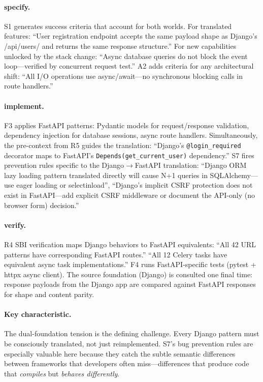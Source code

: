 \documentclass[11pt,a4paper,openright,twoside]{report}
\begin{document}
\paragraph{specify.}
S1 generates success criteria that account for both worlds. For translated features: ``User registration endpoint accepts the same payload shape as Django's /api/users/ and returns the same response structure.'' For new capabilities unlocked by the stack change: ``Async database queries do not block the event loop---verified by concurrent request test.'' A2 adds criteria for any architectural shift: ``All I/O operations use async/await---no synchronous blocking calls in route handlers.''

\paragraph{implement.}
F3 applies FastAPI patterns: Pydantic models for request/response validation, dependency injection for database sessions, async route handlers. Simultaneously, the pre-context from R5 guides the translation: ``Django's \texttt{@login\_required} decorator maps to FastAPI's \texttt{Depends(get\_current\_user)} dependency.'' S7 fires prevention rules specific to the Django$\to$FastAPI translation: ``Django ORM lazy loading pattern translated directly will cause N+1 queries in SQLAlchemy---use eager loading or selectinload'', ``Django's implicit CSRF protection does not exist in FastAPI---add explicit CSRF middleware or document the API-only (no browser form) decision.''

\paragraph{verify.}
R4 SBI verification maps Django behaviors to FastAPI equivalents: ``All 42 URL patterns have corresponding FastAPI routes.'' ``All 12 Celery tasks have equivalent async task implementations.'' F4 runs FastAPI-specific tests (pytest + httpx async client). The source foundation (Django) is consulted one final time: response payloads from the Django app are compared against FastAPI responses for shape and content parity.

\paragraph{Key characteristic.}
The dual-foundation tension is the defining challenge. Every Django pattern must be consciously translated, not just reimplemented. S7's bug prevention rules are especially valuable here because they catch the subtle semantic differences between frameworks that developers often miss---differences that produce code that \emph{compiles} but \emph{behaves differently}.
\end{document}
